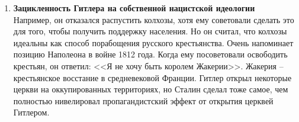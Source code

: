 \documentclass[12pt]{article}
\begin{document}
\begin{enumerate}[label=\textbf{\large\arabic*}]
    \item \textbf{Зацикленность Гитлера на собственной нацистской идеологии} \\
    Например, он отказался распустить колхозы, хотя ему советовали сделать это для того, чтобы получить поддержку населения.
    Но он считал, что колхозы идеальны как способ порабощения русского крестьянства.
    Очень напоминает позицию Наполеона в войне 1812 года.
    Когда ему посоветовали освободить крестьян, он ответил: <<Я не хочу быть королем Жакерии>>.
    Жакерия -- крестьянское восстание в средневековой Франции.
    Гитлер открыл некоторые церкви на оккупированных территориях, но Сталин сделал тоже самое,
    чем полностью нивелировал пропагандистский эффект от открытия церквей Гитлером.
  \end{enumerate}
\end{document}
